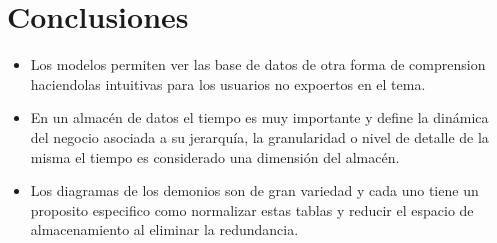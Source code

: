 \section{Conclusiones} 

\begin{itemize}
	\item Los modelos permiten ver las base de datos de otra forma de comprension haciendolas intuitivas para los usuarios no expoertos en el tema.
	\item En un almacén de datos el tiempo es muy importante y define la dinámica del negocio asociada a su jerarquía, la granularidad o nivel de detalle de la misma el tiempo es considerado una dimensión del almacén.
	\item Los diagramas de los demonios son de gran variedad y cada uno tiene un proposito especifico como normalizar estas tablas y reducir el espacio de almacenamiento al eliminar la redundancia.

\end{itemize} 
